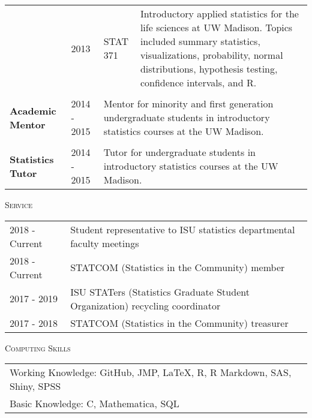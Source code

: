 \documentclass[11pt, oneside]{article}
\begin{document}
\begin{longtable}{p{2cm}p{1cm}p{2cm}p{11.5cm}}
\\
& \hfill{2013} & STAT 371 & Introductory applied statistics for the life sciences at UW Madison. Topics included summary statistics, visualizations, probability, normal distributions, hypothesis testing, confidence intervals, and R.\\
\\
\textbf{Academic Mentor} & \hfill{2014 - 2015} & \multicolumn{2}{p{13.5cm}}{Mentor for minority and first generation undergraduate students in introductory statistics courses at the UW Madison.}\\
\\
\textbf{Statistics Tutor} & \hfill{2014 - 2015} & \multicolumn{2}{p{13.5cm}}{Tutor for undergraduate students in introductory statistics courses at the UW Madison.}
\end{longtable}

\noindent \textsc{Service} \hrulefill

\begin{longtable}{p{2.5cm}p{14cm}}
\hfill{2018 - Current} & Student representative to ISU statistics departmental faculty meetings\\
\hfill{2018 - Current} & STATCOM (Statistics in the Community) member\\
\hfill{2017 - 2019} & ISU STATers (Statistics Graduate Student Organization) recycling coordinator\\
\hfill{2017 - 2018} & STATCOM (Statistics in the Community) treasurer
\end{longtable}

\noindent \textsc{Computing Skills} \hrulefill

\begin{longtable}{p{16.5cm}}
Working Knowledge: GitHub, JMP, \LaTeX, R, R Markdown, SAS, Shiny, SPSS\\
Basic Knowledge: C, Mathematica, SQL
\end{longtable}
\end{document}
